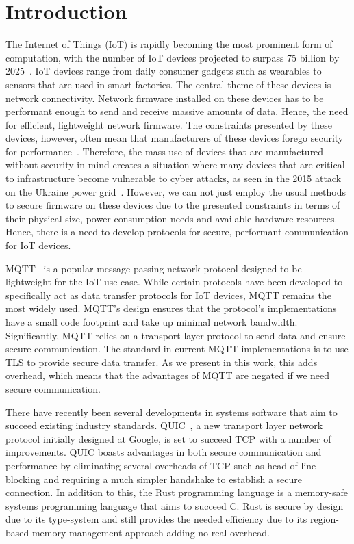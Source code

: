 \chapter{Introduction}


The Internet of Things (IoT) is rapidly becoming the most prominent form of computation, with the number of IoT devices projected to surpass 75 billion by 2025~\citep{statista_number_2016}.
IoT devices range from daily consumer gadgets such as wearables to sensors that are used in smart factories.
The central theme of these devices is network connectivity.
Network firmware installed on these devices has to be performant enough to send and receive massive amounts of data. 
Hence, the need for efficient, lightweight network firmware.
The constraints presented by these devices, however, often mean that manufacturers of these devices forego security for performance~\citep{ling_iot_2018}.
Therefore, the mass use of devices that are manufactured without security in mind creates a situation where many devices that are critical to infrastructure become vulnerable to cyber attacks, as seen in the 2015 attack on the Ukraine power grid~\citep{Liang2017}.
However, we can not just employ the usual methods to secure firmware on these devices due to the presented constraints in terms of their physical size, power consumption needs and available hardware resources.
Hence, there is a need to develop protocols for secure, performant communication for IoT devices.

MQTT~\citep{oasis_mqtt_2014} is a popular message-passing network protocol designed to be lightweight for the IoT use case.
While certain protocols have been developed to specifically act as data transfer protocols for IoT devices, MQTT remains the most widely used.
MQTT's design ensures that the protocol's implementations have a small code footprint and take up minimal network bandwidth.
Significantly, MQTT relies on a transport layer protocol to send data and ensure secure communication.
The standard in current MQTT implementations is to use TLS to provide secure data transfer.
As we present in this work, this adds overhead, which means that the advantages of MQTT are negated if we need secure communication.

There have recently been several developments in systems software that aim to succeed existing industry standards.
QUIC~\citep{iyengar_quic_2021}, a new transport layer network protocol initially designed at Google, is set to succeed TCP with a number of improvements.
QUIC boasts advantages in both secure communication and performance by eliminating several overheads of TCP such as head of line blocking and requiring a much simpler handshake to establish a secure connection.
In addition to this, the Rust programming language is a memory-safe systems programming language that aims to succeed C.
Rust is secure by design due to its type-system and still provides the needed efficiency due to its region-based memory management approach adding no real overhead.

